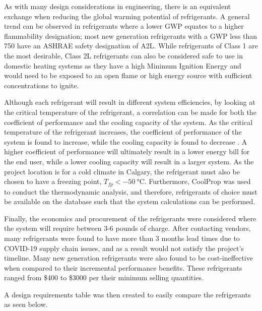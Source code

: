\medskip
As with many design considerations in engineering, there is an equivalent exchange when reducing the global warming potential of refrigerants. A general trend can be observed in refrigerants where a lower GWP equates to a higher flammability designation; most new generation refrigerants with a GWP less than 750 have an ASHRAE safety designation of A2L. While refrigerants of Class 1 are the most desirable, Class 2L refrigerants can also be considered safe \cite{low_gwp} to use in domestic heating systems as they have a high Minimum Ignition Energy and would need to be exposed to an open flame or high energy source with sufficient concentrations to ignite.

\medskip
Although each refrigerant will result in different system efficiencies, by looking at the critical temperature of the refrigerant, a correlation can be made for both the coefficient of performance and the cooling capacity of the system. As the critical temperature of the refrigerant increases, the coefficient of performance of the system is found to increase, while the cooling capacity is found to decrease \cite{low_gwp_options}. A higher coefficient of performance will ultimately result in a lower energy bill for the end user, while a lower cooling capacity will result in a larger system. As the project location is for a cold climate in Calgary, the refrigerant must also be chosen to have a freezing point, $T_{fp} < \SI{-50}{\celsius}$. Furthermore, CoolProp \cite{cool_prop} was used to conduct the thermodynamic analysis, and therefore, refrigerants of choice must be available on the database such that the system calculations can be performed.

\medskip
Finally, the economics and procurement of the refrigerants were considered where the system will require between 3-6 pounds of charge. After contacting vendors, many refrigerants were found to have more than 3 months lead times due to COVID-19 supply chain issues, and as a result would not satisfy the project’s timeline. Many new generation refrigerants were also found to be cost-ineffective when compared to their incremental performance benefits. These refrigerants ranged from \$400 to \$3000 per their minimum selling quantities.

\medskip
A design requirements table was then created to easily compare the refrigerants as seen below.

